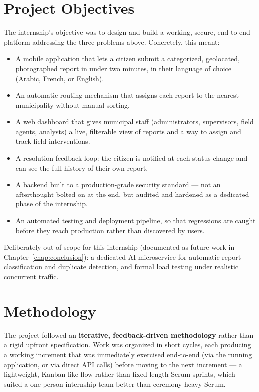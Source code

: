 \section{Project Objectives}

The internship's objective was to design and build a working, secure, end-to-end platform addressing the three problems above. Concretely, this meant:

\begin{itemize}[leftmargin=*]
  \item A mobile application that lets a citizen submit a categorized, geolocated, photographed report in under two minutes, in their language of choice (Arabic, French, or English).
  \item An automatic routing mechanism that assigns each report to the nearest municipality without manual sorting.
  \item A web dashboard that gives municipal staff (administrators, supervisors, field agents, analysts) a live, filterable view of reports and a way to assign and track field interventions.
  \item A resolution feedback loop: the citizen is notified at each status change and can see the full history of their own report.
  \item A backend built to a production-grade security standard --- not an afterthought bolted on at the end, but audited and hardened as a dedicated phase of the internship.
  \item An automated testing and deployment pipeline, so that regressions are caught before they reach production rather than discovered by users.
\end{itemize}

Deliberately out of scope for this internship (documented as future work in Chapter~\ref{chap:conclusion}): a dedicated AI microservice for automatic report classification and duplicate detection, and formal load testing under realistic concurrent traffic.

\section{Methodology}

The project followed an \textbf{iterative, feedback-driven methodology} rather than a rigid upfront specification. Work was organized in short cycles, each producing a working increment that was immediately exercised end-to-end (via the running application, or via direct API calls) before moving to the next increment --- a lightweight, Kanban-like flow rather than fixed-length Scrum sprints, which suited a one-person internship team better than ceremony-heavy Scrum.

